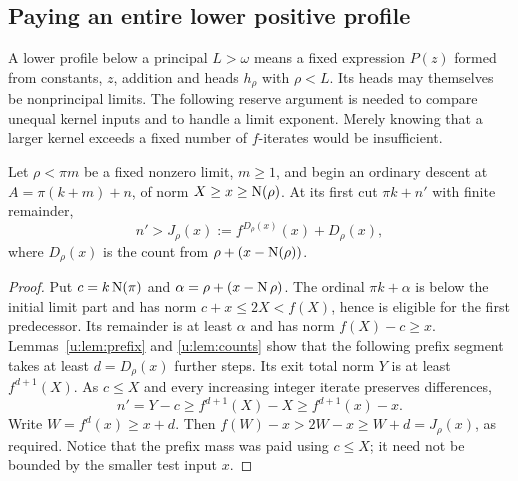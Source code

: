 \subsection{Paying an entire lower positive profile}
A lower profile below a principal $L>\omega$ means a fixed expression
$P(z)$ formed from constants, $z$, addition and heads $h_\rho$ with
$\rho<L$. Its heads may themselves be nonprincipal limits.
The following reserve argument is needed to compare unequal kernel inputs
and to handle a limit exponent. Merely knowing that a larger kernel exceeds
a fixed number of $f$-iterates would be insufficient.

\begin{lemma}\label{u:lem:stage}
Let $\rho<\pi m$ be a fixed nonzero limit, $m\ge1$, and begin an ordinary
descent at $A=\pi(k+m)+n$, of norm $X\ge x\ge\operatorname{N}(\rho)$.
At its first cut $\pi k+n'$ with finite remainder,
\begin{equation}
        n'>J_\rho(x):=f^{D_\rho(x)}(x)+D_\rho(x),    \label{u:display:5-1}
\end{equation}
where $D_\rho(x)$ is the count from
$\rho+(x-\operatorname{N}(\rho))$.
\end{lemma}
\begin{proof}
Put $c=k\operatorname{N}(\pi)$ and $\alpha=\rho+(x-\operatorname{N}\rho)$.
The ordinal $\pi k+\alpha$ is below the initial limit part and has norm
$c+x\le2X<f(X)$, hence is eligible for the first predecessor. Its
remainder is at least $\alpha$ and has norm $f(X)-c\ge x$.
Lemmas~\ref{u:lem:prefix} and \ref{u:lem:counts} show that the following
prefix segment takes at least $d=D_\rho(x)$ further steps. Its exit total
norm $Y$ is at least $f^{d+1}(X)$. As $c\le X$ and every increasing
integer iterate preserves differences,
\[
 n'=Y-c\ge f^{d+1}(X)-X\ge f^{d+1}(x)-x.
\]
Write $W=f^d(x)\ge x+d$. Then
$f(W)-x>2W-x\ge W+d=J_\rho(x)$, as required.
Notice that the prefix mass was paid using $c\le X$; it need not be
bounded by the smaller test input $x$.
\end{proof}

